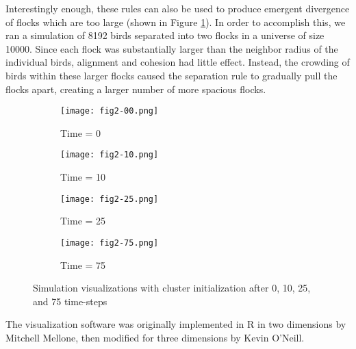 Interestingly enough, these rules can also be used to produce emergent
divergence of flocks which are too large (shown in Figure
\ref{fig:visuals2}). In order to accomplish this, we ran a simulation
of 8192 birds separated into two flocks in a universe of size
10000. Since each flock was substantially larger than the neighbor
radius of the individual birds, alignment and cohesion had little
effect. Instead, the crowding of birds within these larger flocks
caused the separation rule to gradually pull the flocks apart,
creating a larger number of more spacious flocks.

\begin{figure}[h!]
  \centering
  \begin{subfigure}{0.24\textwidth}
    \centering
    \texttt{[image: fig2-00.png]}
    \caption{Time = 0}
  \end{subfigure}
  \begin{subfigure}{0.24\textwidth}
    \centering
    \texttt{[image: fig2-10.png]}
    \caption{Time = 10}
  \end{subfigure}
  \begin{subfigure}{0.24\textwidth}
    \centering
    \texttt{[image: fig2-25.png]}
    \caption{Time = 25}
  \end{subfigure}
  \begin{subfigure}{0.24\textwidth}
    \centering
    \texttt{[image: fig2-75.png]}
    \caption{Time = 75}
  \end{subfigure}
  
  \caption{Simulation visualizations with cluster initialization after
    0, 10, 25, and 75 time-steps}
  \label{fig:visuals2}
\end{figure}

The visualization software was originally implemented in R in two
dimensions by Mitchell Mellone, then modified for three dimensions by
Kevin O'Neill.
